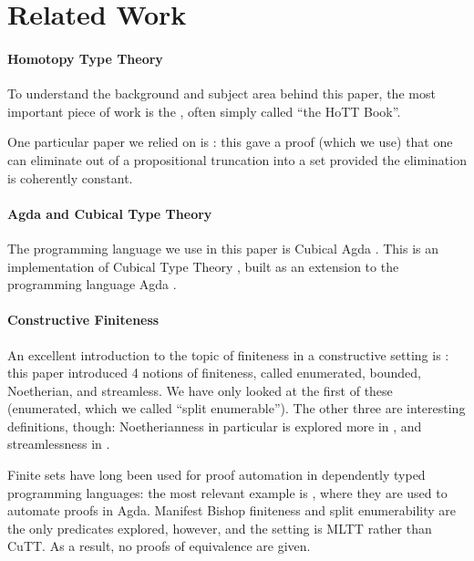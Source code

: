 \section{Related Work}
\paragraph{Homotopy Type Theory}
To understand the background and subject area behind this paper, the most
important piece of work is the \citet{hottbook}, often simply called ``the HoTT
Book''.

One particular paper we relied on is \citet{krausGeneralUniversalProperty2015}:
this gave a proof (which we use) that one can eliminate out of a propositional
truncation into a set provided the elimination is coherently constant.
\paragraph{Agda and Cubical Type Theory}
The programming language we use in this paper is Cubical Agda
\citep{vezzosiCubicalAgdaDependently2019}.
This is an implementation of Cubical Type Theory
\citep{cohenCubicalTypeTheory2016}, built as an extension to the programming
language Agda \citep{norellDependentlyTypedProgramming2008}.
\paragraph{Constructive Finiteness}
An excellent introduction to the topic of finiteness in a constructive setting
is \citet{coquandConstructivelyFinite2010}: this paper introduced 4 notions of
finiteness, called enumerated, bounded, Noetherian, and streamless.
We have only looked at the first of these (enumerated, which we called ``split
enumerable'').
The other three are interesting definitions, though: Noetherianness in
particular is explored more in \citet{firsovVariationsNoetherianness2016}, and
streamlessness in \citet{parmannInvestigatingStreamlessSets2015}.

Finite sets have long been used for proof automation in dependently typed
programming languages: the most relevant example is
\citet{firsovDependentlyTypedProgramming2015}, where they are used to automate
proofs in Agda.
Manifest Bishop finiteness and split enumerability are the only predicates
explored, however, and the setting is MLTT rather than CuTT.
As a result, no proofs of equivalence are given.

